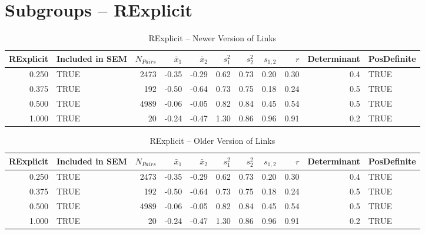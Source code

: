 \documentclass{article}\usepackage[]{graphicx}\usepackage[]{color}
\begin{document}
\section{Subgroups --  RExplicit }%
\begin{table}[ht]
\centering
\begin{tabular}{rlrrrrrrrrl}
  \hline
RExplicit & Included in SEM & $N_{Pairs}$ & $\bar{x}_1$ & $\bar{x}_2$ & $s_1^2$ & $s_2^2$ & $s_{1,2}$ & $r$ & Determinant & PosDefinite \\ 
  \hline
0.250 & TRUE & 2473 & -0.35 & -0.29 & 0.62 & 0.73 & 0.20 & 0.30 & 0.4 & TRUE \\ 
  0.375 & TRUE & 192 & -0.50 & -0.64 & 0.73 & 0.75 & 0.18 & 0.24 & 0.5 & TRUE \\ 
  0.500 & TRUE & 4989 & -0.06 & -0.05 & 0.82 & 0.84 & 0.45 & 0.54 & 0.5 & TRUE \\ 
  1.000 & TRUE & 20 & -0.24 & -0.47 & 1.30 & 0.86 & 0.96 & 0.91 & 0.2 & TRUE \\ 
   \hline
\end{tabular}
\caption{RExplicit -- Newer Version of Links} 
\end{table}
\begin{table}[ht]
\centering
\begin{tabular}{rlrrrrrrrrl}
  \hline
RExplicit & Included in SEM & $N_{Pairs}$ & $\bar{x}_1$ & $\bar{x}_2$ & $s_1^2$ & $s_2^2$ & $s_{1,2}$ & $r$ & Determinant & PosDefinite \\ 
  \hline
0.250 & TRUE & 2473 & -0.35 & -0.29 & 0.62 & 0.73 & 0.20 & 0.30 & 0.4 & TRUE \\ 
  0.375 & TRUE & 192 & -0.50 & -0.64 & 0.73 & 0.75 & 0.18 & 0.24 & 0.5 & TRUE \\ 
  0.500 & TRUE & 4989 & -0.06 & -0.05 & 0.82 & 0.84 & 0.45 & 0.54 & 0.5 & TRUE \\ 
  1.000 & TRUE & 20 & -0.24 & -0.47 & 1.30 & 0.86 & 0.96 & 0.91 & 0.2 & TRUE \\ 
   \hline
\end{tabular}
\caption{RExplicit -- Older Version of Links} 
\end{table}
\newpage 
\end{document}
